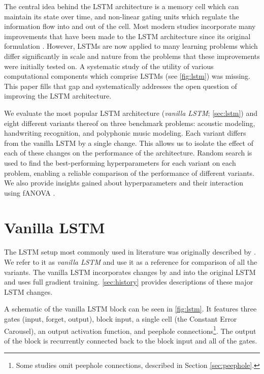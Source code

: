 The central idea behind the LSTM architecture is a memory cell which can maintain its state over time, and non-linear gating units which regulate the information flow into and out of the cell. Most modern studies incorporate many improvements that have been made to the LSTM architecture since its original formulation \cite{Hochreiter1995,Hochreiter1997}. However, LSTMs are now applied to many learning problems which differ significantly in scale and nature from the problems that these improvements were initially tested on. A systematic study of the utility of various computational components which comprise LSTMs (see \autoref{fig:lstm}) was missing. This paper fills that gap and systematically addresses the open question of improving the LSTM architecture.

We evaluate the most popular LSTM architecture (\emph{vanilla LSTM}; \autoref{sec:lstm}) and eight different variants thereof on three benchmark problems: acoustic modeling, handwriting recognition, and polyphonic music modeling. Each variant differs from the vanilla LSTM by a single change. This allows us to isolate the effect of each of these changes on the performance of the architecture. Random search \citep{Anderson1953, Solis1981, Bergstra2012} is used to find the best-performing hyperparameters for each variant on each problem, enabling a reliable comparison of the performance of different variants. We also provide insights gained about hyperparameters and their interaction using fANOVA \citep{Hutter2014}. 

\section{Vanilla LSTM}
\label{sec:lstm}

The LSTM setup most commonly used in literature was originally described by \citet{Graves2005}. We refer to it as \emph{vanilla LSTM} and use it as a reference for comparison of all the variants. The vanilla LSTM incorporates changes by \citet{Gers1999} and \citet{Gers2000} into the original LSTM~\cite{Hochreiter1997} and uses full gradient training. \autoref{sec:history} provides descriptions of these major LSTM changes.

A schematic of the vanilla LSTM block can be seen in \autoref{fig:lstm}.
It features three gates (input, forget, output), block input, a single cell (the Constant Error Carousel), an output activation function, and peephole connections\footnote{Some studies omit peephole connections, described in Section \ref{sec:peephole}.}. 
The output of the block is recurrently connected back to the block input and all of the gates.

